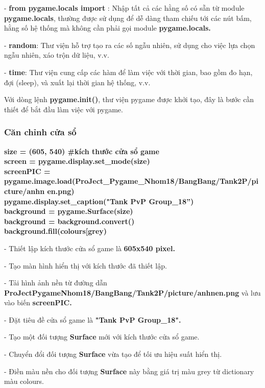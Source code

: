 \documentclass[a4paper]{article}
\begin{document}
- \textbf{from pygame.locals import} : Nhập tất cả các hằng số có sẵn từ
module \textbf{pygame.locals}, thường được sử dụng để dễ dàng tham chiếu
tới các nút bấm, hằng số hệ thống mà không cần phải gọi module
\textbf{pygame.locals.}

- \textbf{random}: Thư viện hỗ trợ tạo ra các số ngẫu nhiên, sử dụng cho
việc lựa chọn ngẫu nhiên, xáo trộn dữ liệu, v.v.

- \textbf{time}: Thư viện cung cấp các hàm để làm việc với thời gian,
bao gồm đo hạn, đợi (sleep), và xuất lại thời gian hệ thống, v.v.

Với dòng lệnh \textbf{pygame.init()}, thư viện pygame được khởi tạo, đây
là bước cần thiết để bắt đầu làm việc với pygame.
\subsubsection{Căn chỉnh cửa sổ}
\textbf{size = (605, 540) \#kích thước cửa sổ game}\\
\textbf{screen = pygame.display.set\_mode(size)}\\
\textbf{screenPIC =}\\
\textbf{pygame.image.load(\textquotesingle ProJect\_Pygame\_Nhom18/BangBang/Tank2P/picture/anhn
en.png\textquotesingle)}\\
\textbf{pygame.display.set\_caption("Tank PvP Group\_18'')}\\
\textbf{background = pygame.Surface(size)}\\
\textbf{background = background.convert()}\\
\textbf{background.fill(colours{[}\textquotesingle grey\textquotesingle{]})}

- Thiết lập kích thước cửa sổ game là \textbf{605x540 pixel.}

- Tạo màn hình hiển thị với kích thước đã thiết lập.

- Tải hình ảnh nền từ đường dẫn\\
\textbf{\textquotesingle ProJectPygameNhom18/BangBang/Tank2P/picture/anhnen.png\textquotesingle{}}
và lưu vào biến \textbf{screenPIC.}

- Đặt tiêu đề cửa sổ game là \textbf{"Tank PvP Group\_18".}

- Tạo một đối tượng \textbf{Surface} mới với kích thước cửa sổ game.

- Chuyển đổi đối tượng \textbf{Surface} vừa tạo để tối ưu hiệu suất hiển
thị.

- Điền màu nền cho đối tượng \textbf{Surface} này bằng giá trị màu
\textquotesingle grey\textquotesingle{} từ dictionary màu colours.
\end{document}

